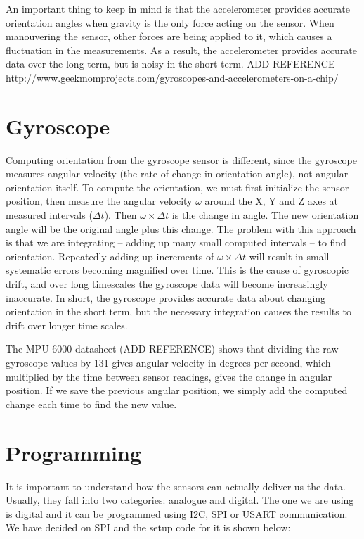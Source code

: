 An important thing to keep in mind is that the accelerometer provides accurate orientation angles when gravity is the only force acting on the sensor. When manouvering the sensor, other forces are being applied to it, which causes a fluctuation in the measurements. As a result, the accelerometer provides accurate data over the long term, but is noisy in the short term. ADD REFERENCE http://www.geekmomprojects.com/gyroscopes-and-accelerometers-on-a-chip/

\section{Gyroscope}
Computing orientation from the gyroscope sensor is different, since the gyroscope measures angular velocity (the rate of change in orientation angle), not angular orientation itself. To compute the orientation, we must first initialize the sensor position, then measure the angular velocity $\omega$ around the X, Y and Z axes at measured intervals ($\Delta t$).   Then $\omega \times \Delta t$ is the change in angle. The new orientation angle will be the original angle plus this change. The problem with this approach is that we are integrating – adding up many small computed intervals – to find orientation.  Repeatedly adding up increments of  $\omega \times \Delta t$ will result in small systematic errors becoming magnified over time. This is the cause of gyroscopic drift, and over long timescales the gyroscope data will become increasingly inaccurate. In short, the gyroscope provides accurate data about changing orientation in the short term, but the necessary integration causes the results to drift over longer time scales.

The MPU-6000 datasheet (ADD REFERENCE) shows that dividing the raw gyroscope values by 131 gives angular velocity in degrees per second, which multiplied by the time between sensor readings, gives the change in angular position. If we save the previous angular position, we simply add the computed change each time to find the new value.


\section{Programming}
It is important to understand how the sensors can actually deliver us the data. Usually, they fall into two categories: analogue and digital. The one we are using is digital and it can be programmed using I2C, SPI or USART communication. We have decided on SPI and the setup code for it is shown below:

